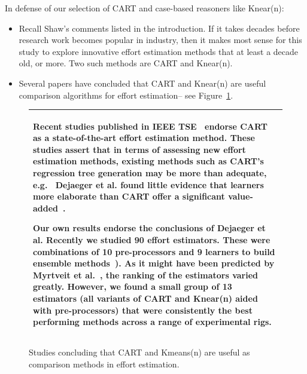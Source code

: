 \documentclass{sig-alternate}
\newcommand{\bi}{\begin{itemize}}
\newcommand{\ei}{\end{itemize}}
\newcommand{\fig}[1]{Figure~\ref{fig:#1}}
\begin{document}
In defense of our selection of CART and case-based
reasoners like Knear(n):
\bi
\item 
Recall Shaw's comments listed in the introduction. 
If it takes decades before research work becomes popular
in industry, then it makes most sense for this study to
explore innovative effort estimation methods that at least
a decade old, or more. Two such methods are CART and Knear(n).
\item
Several papers have concluded
that CART and Knear(n)
are useful comparison algorithms for effort
estimation-- see Figure~\ref{fig:kcart}.
\ei
\begin{figure}[!t]
{\small
\begin{tabular}{|p{.95\linewidth}|}\hline
Recent studies published in IEEE
TSE~\cite{keung2008b,me13a,dejaeger12}
endorse
CART as a state-of-the-art effort estimation method.  These
studies assert that in terms of assessing new effort
estimation methods, existing methods such as CART's
regression tree generation may be more than
adequate, e.g.~ Dejaeger et al. found little
evidence that learners more elaborate than CART
offer a significant value-added~\cite{dejaeger12}.

Our own results endorse the conclusions of
Dejaeger et al. 
Recently we studied 90
effort estimators. These were  combinations of 10
pre-processors and 9 learners to build ensemble
methods~\cite{koc11a}).  As it might have been
predicted by Myrtveit et al.~\cite{myrtveit05}, the
ranking of the estimators varied greatly.
However, we found a small group of 13 estimators
(all variants of CART and Knear(n) aided with
pre-processors) that were consistently the best
performing methods across a range of experimental rigs.
\\\hline
\end{tabular}}
\caption{Studies concluding that CART and Kmeans(n)
are useful as comparison methods in effort estimation.}
\label{fig:kcart}
\end{figure}

\end{document}
